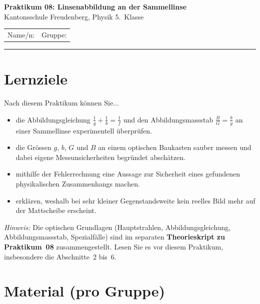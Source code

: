 \documentclass[11pt,a4paper]{article}
\begin{document}
\thispagestyle{empty}

\begin{center}
  {\color{kfrblue}\Large\bfseries Praktikum 08: Linsenabbildung an der Sammellinse}\\[2pt]
  {\normalsize Kantonsschule Freudenberg, Physik 5.\ Klasse}
\end{center}
\vspace{4pt}
\noindent
\begin{tabularx}{\linewidth}{@{}X X@{}}
  Name/n: \dotfill & Gruppe: \dotfill \\
\end{tabularx}
\vspace{10pt}\hrule\vspace{10pt}

\section{Lernziele}

Nach diesem Praktikum können Sie...
\begin{itemize}[nosep]
  \item die Abbildungsgleichung $\frac{1}{g}+\frac{1}{b}=\frac{1}{f}$ und den
    Abbildungsmassstab $\frac{B}{G}=\frac{b}{g}$ an einer Sammellinse experimentell
    überprüfen.
  \item die Grössen $g$, $b$, $G$ und $B$ an einem optischen Baukasten
    sauber messen und dabei eigene Messunsicherheiten begründet
    abschätzen.
  \item mithilfe der Fehlerrechnung eine Aussage zur Sicherheit eines
    gefundenen physikalischen Zusammenhangs machen.
  \item erklären, weshalb bei sehr kleiner Gegenstandsweite kein reelles Bild
    mehr auf der Mattscheibe erscheint.
\end{itemize}

\noindent\emph{Hinweis:} Die optischen Grundlagen (Hauptstrahlen,
Abbildungsgleichung, Abbildungsmassstab, Spezialfälle) sind im separaten
\textbf{Theorieskript zu Praktikum~08} zusammengestellt. Lesen Sie es vor
diesem Praktikum, insbesondere die Abschnitte~2 bis~6.

\section{Material (pro Gruppe)}
\end{document}
